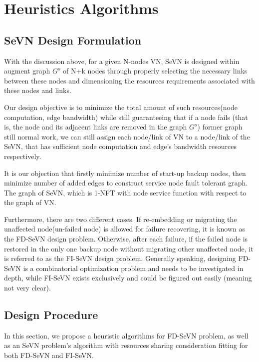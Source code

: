 \section{Heuristics Algorithms}



\subsection{SeVN Design Formulation}
\label{sub:SeVNDesignFormulation}
With the discussion above, for a given N-nodes VN, SeVN is designed within augment graph $G^o$ of N+k nodes through properly selecting the necessary links between these nodes and dimensioning the resources requirements associated with these nodes and links.

Our design objective is to minimize the total amount of such resources(node computation, edge bandwidth) while still guaranteeing that if a node fails (that is, the node and its adjacent links are removed in the graph $G^o$) former graph still normal work, we can still assign each node/link of VN to a node/link of the SeVN, that has sufficient node computation and edge's bandwidth resources respectively.

It is our objection that firstly minimize number of start-up backup nodes, then minimize number of added edges to construct service node fault tolerant graph. The graph of SeVN, which is 1-NFT with node service function with respect to the graph of VN.


Furthermore, there are two different cases. If re-embedding or migrating the unaffected node(un-failed node) is allowed for failure recovering, it is known as the FD-SeVN design problem. Otherwise, after each failure, if the failed node is restored in the only one backup node without migrating other unaffected node, it is referred to as the FI-SeVN design problem. Generally speaking, designing FD-SeVN is a combinatorial optimization problem and needs to be investigated in depth, while FI-SeVN exists exclusively and could be figured out easily (meaning not very clear).


\subsection{Design Procedure}

In this section, we propose a heuristic algorithms for FD-SeVN problem, as well as an SeVN problem's algorithm with resources sharing consideration fitting for both FD-SeVN and FI-SeVN.

